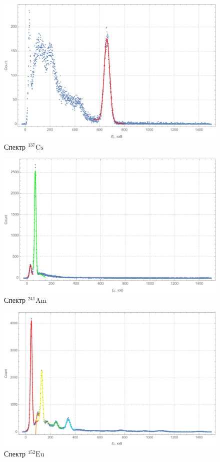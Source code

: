 \documentclass[a4paper, 12pt]{article}
\begin{document}
	 \begin{figure}[!htb]
	 	\centering
	 	\includegraphics[scale=0.65]{cs137.pdf}
	 	\caption{Спектр $^{137}\text{Cs}$}
	 \end{figure}
	 \begin{figure}[!htb]
	 	\centering
	 	\includegraphics[scale=0.7]{am241.pdf}
	 	\caption{Спектр $^{241}\text{Am}$}
	 \end{figure}
	 \begin{figure}[!htb]
	 	\centering
	 	\includegraphics[scale=0.7]{eu152.pdf}
	 	\caption{Спектр $^{152}\text{Eu}$}
	 \end{figure}
\end{document}
